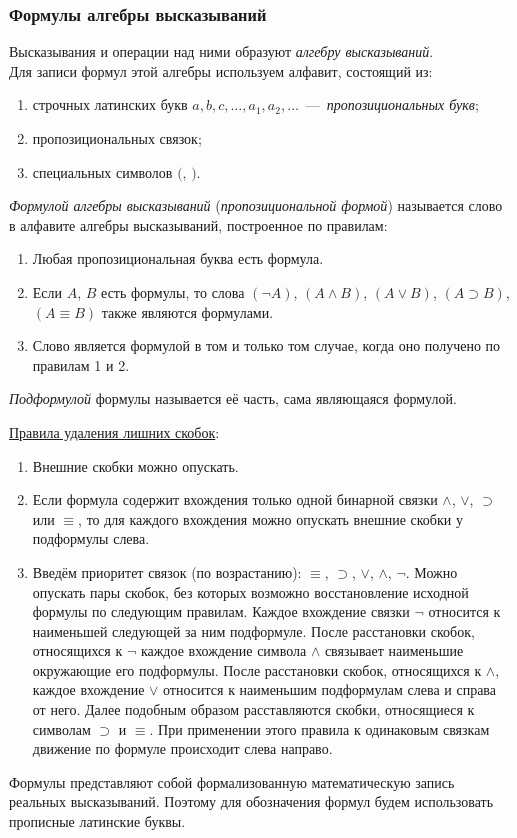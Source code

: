 \subsubsection{Формулы алгебры высказываний}\label{par:formulas_boolean}
Высказывания и операции над ними образуют \textit{алгебру высказываний}. \\
Для записи формул этой алгебры используем алфавит, состоящий из:
\begin{enumerate}
    \item строчных латинских букв $a, b, c, \dots, a_1, a_2, \dots$~---~\textit{пропозициональных букв}; 
    \item пропозициональных связок;
    \item специальных символов $($, $)$.
\end{enumerate}
\begin{definition*}
    \textit{Формулой алгебры высказываний} (\textit{пропозициональной формой}) называется слово в алфавите алгебры высказываний, построенное по правилам:
    \begin{enumerate}
        \item Любая пропозициональная буква есть формула.
        \item Если $A$, $B$ есть формулы, то слова $(\neg A)$, $(A \land B)$, $(A \lor B)$, $(A \supset B)$, $(A \equiv B)$ также являются формулами.
        \item Слово является формулой в том и только том случае, когда оно получено по правилам 1 и 2.
    \end{enumerate}
\end{definition*}
\begin{definition*}
    \textit{Подформулой} формулы называется её часть, сама являющаяся формулой.
\end{definition*}
\underline{Правила удаления лишних скобок}:
\begin{enumerate}
    \item Внешние скобки можно опускать.
    \item Если формула содержит вхождения только одной бинарной связки $\land$, $\lor$, $\supset$ или $\equiv$, то для каждого вхождения можно опускать внешние скобки у подформулы слева.
    \item Введём приоритет связок (по возрастанию): $\equiv$, $\supset$, $\lor$, $\land$, $\neg$. Можно опускать пары скобок, без которых возможно восстановление исходной формулы по следующим правилам. Каждое вхождение связки $\neg$ относится к наименьшей следующей за ним подформуле. После расстановки скобок, относящихся к $\neg$ каждое вхождение символа $\land$ связывает наименьшие окружающие его подформулы. После расстановки скобок, относящихся к $\land$, каждое вхождение $\lor$ относится к наименьшим подформулам слева и справа от него. Далее подобным образом расставляются скобки, относящиеся к символам $\supset$ и $\equiv$. При применении этого правила к одинаковым связкам движение по формуле происходит слева направо.
\end{enumerate}
Формулы представляют собой формализованную математическую запись реальных высказываний. Поэтому для обозначения формул будем использовать прописные латинские буквы.

